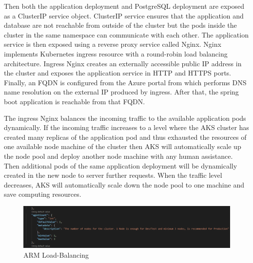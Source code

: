 Then both the application deployment and PostgreSQL deployment are exposed as a ClusterIP service object. ClusterIP service ensures that the application and database are not reachable from outside of the cluster but the pods inside the cluster in the same namespace can communicate with each other. The application service is then exposed using a reverse proxy service called Nginx. Nginx implements Kubernetes ingress resource with a round-robin load balancing architecture. Ingress Nginx creates an externally accessible public IP address in the cluster and exposes the application service in HTTP and HTTPS ports. Finally, an FQDN is configured from the Azure portal from which performs DNS name resolution on the external IP produced by ingress. After that, the spring boot application is reachable from that FQDN.

The ingress Nginx balances the incoming traffic to the available application pods dynamically. If the incoming traffic increases to a level where the AKS cluster has created many replicas of the application pod and thus exhausted the resources of one available node machine of the cluster then AKS will automatically scale up the node pool and deploy another node machine with any human assistance. Then additional pods of the same application deployment will be dynamically created in the new node to server further requests. When the traffic level decreases, AKS will automatically scale down the node pool to one machine and save computing resources.

\begin{figure}
    \centering
    \includegraphics[width=14cm]{images/Rahat/ARM-LB.PNG}
    \caption{ARM Load-Balancing}
    \label{fig:arm_laodbalancing}
\end{figure}